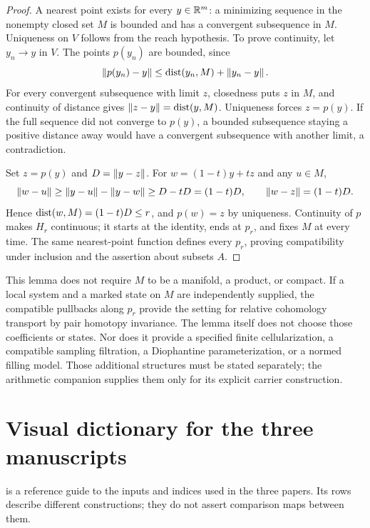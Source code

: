 \documentclass[11pt,a4paper]{article}
\begin{document}
\begin{proof}
A nearest point exists for every $y\in\mathbb R^m$: a minimizing sequence in
the nonempty closed set $M$ is bounded and has a convergent subsequence
in $M$.  Uniqueness on $V$ follows from the reach hypothesis.
To prove continuity, let $y_n\to y$ in $V$.  The points $p(y_n)$ are
bounded, since
\[
 \left\lVert p(y_n)-y\right\rVert\leq\operatorname{dist}(y_n,M)+\left\lVert y_n-y\right\rVert.
\]
For every convergent subsequence with limit $z$, closedness puts $z$ in
$M$, and continuity of distance gives
$\left\lVert z-y\right\rVert=\operatorname{dist}(y,M)$.  Uniqueness forces $z=p(y)$.  If the full
sequence did not converge to $p(y)$, a bounded subsequence staying a
positive distance away would have a convergent subsequence with another
limit, a contradiction.

Set $z=p(y)$ and $D=\left\lVert y-z\right\rVert$.  For $w=(1-t)y+tz$ and any $u\in M$,
\[
 \left\lVert w-u\right\rVert\geq\left\lVert y-u\right\rVert-\left\lVert y-w\right\rVert\geq D-tD=(1-t)D,
 \qquad \left\lVert w-z\right\rVert=(1-t)D.
\]
Hence $\operatorname{dist}(w,M)=(1-t)D\leq r$, and $p(w)=z$ by uniqueness.
Continuity of $p$ makes $H_r$ continuous; it starts at the identity,
ends at $p_r$, and fixes $M$ at every time.  The same nearest-point
function defines every $p_r$, proving compatibility under inclusion and
the assertion about subsets $A$.
\end{proof}

This lemma does not require $M$ to be a manifold, a product, or compact.
If a local system and a marked state on $M$ are independently supplied,
the compatible pullbacks along $p_r$ provide the setting for relative
cohomology transport by pair homotopy invariance.  The lemma itself does
not choose those coefficients or states.  Nor does it provide a specified
finite cellularization, a compatible sampling filtration, a Diophantine
parameterization, or a normed filling model.  Those additional structures
must be stated separately; the arithmetic companion supplies them only
for its explicit carrier construction.

\section{Visual dictionary for the three manuscripts}
\label{sec:visual-dictionary}

 is a reference guide to the inputs and indices
used in the three papers. Its rows describe different constructions;
they do not assert comparison maps between them.




\end{document}
